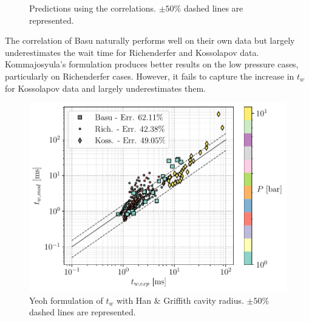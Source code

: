 \begin{figure}
\centering
{}
\caption{Predictions using the correlations. $\pm 50\%$ dashed lines are represented.}
\label{fig:tw_pred_correl}
\end{figure}

\npar
The correlation of Basu \etal naturally performs well on their own data but largely underestimates the wait time for Richenderfer and Kossolapov data. Kommajosyula's formulation produces better results on the low pressure cases, particularly on Richenderfer cases. However, it fails to capture the increase in $t_{w}$ for Kossolapov data and largely underestimates them.


\begin{figure}
\centering
\includegraphics[width=0.5\linewidth]{img/tw/twYeoh_RcHan.pdf}
\caption{Yeoh \etal formulation of $t_{w}$ with Han \& Griffith cavity radius. $\pm 50\%$ dashed lines are represented.}
\label{fig:tw_pred_anal}
\end{figure}

